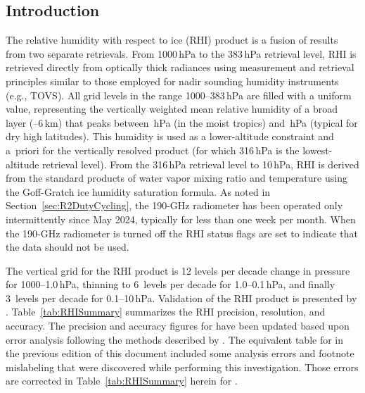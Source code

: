 
\subsection{Introduction}

The relative humidity with respect to ice (RHI) product is a fusion of results from two separate retrievals. From 1000\,hPa to the 383\,hPa retrieval level, RHI is retrieved directly from optically thick radiances using measurement and retrieval principles similar to those employed for nadir sounding humidity instruments (e.g., TOVS). All grid levels in the range 1000--383\,hPa are filled with a uniform value, representing the vertically weighted mean relative humidity of a broad layer (--6\,km) that peaks between \,hPa (in the moist tropics) and \,hPa (typical for dry high latitudes). This humidity is used as a lower-altitude constraint and a~priori for the vertically resolved  product (for which 316\,hPa is the lowest-altitude retrieval level). From the 316\,hPa retrieval level to 10\,hPa, RHI is derived from the standard products of water vapor mixing ratio and temperature using the Goff-Gratch ice humidity saturation formula. As noted in Section~\ref{sec:R2DutyCycling}, the 190\nobreakdash-GHz radiometer has been operated only intermittently since May 2024, typically for less than one week per month. When the \mbox{190-GHz} radiometer is turned off the RHI status flags are set to indicate that the data should not be used. 

The vertical grid for the RHI product is 12 levels per decade change in pressure for 1000--1.0\,hPa, thinning to 6~levels per decade for 1.0--0.1\,hPa, and finally 3~levels per decade for 0.1--10\,hPa. Validation of the \vii RHI product is presented by \citet{ReadEtal:2007}. Table~\ref{tab:RHISummary} summarizes the RHI precision, resolution, and accuracy. The precision and accuracy figures for \thisv have been updated based upon error analysis following the methods described by \citet{ReadEtal:2007}. The equivalent table for \prevv in the previous edition of this document \citep{EOSMLSV5Quality} included some analysis errors and footnote mislabeling that were discovered while performing this investigation. Those errors are corrected in Table~\ref{tab:RHISummary} herein for \thisv.

